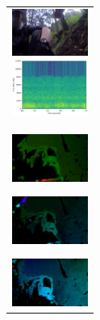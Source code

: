 \begin{figure}[H]
\begin{tabular}{l}
\begin{minipage}{0.165\hsize}
\begin{center}
          \includegraphics[clip, width=2.5cm]{./Figures/still_seevictim5.eps}
        \end{center}
      \end{minipage}
      \begin{minipage}{0.165\hsize}
        \begin{center}
          \includegraphics[clip, width=2.5cm]{./Figures/sound_seevictim.eps}
        \end{center}
      \end{minipage}
\\  %
      \begin{minipage}{0.165\hsize}
        \begin{center}
          \includegraphics[clip, width=2.5cm]{./Figures/optic_seevictim1.eps}
          \hspace{0.3cm} { }
        \end{center}
      \end{minipage}
      \begin{minipage}{0.165\hsize}
        \begin{center}
          \includegraphics[clip, width=2.5cm]{./Figures/optic_seevictim2.eps}
          \hspace{0.0cm} { }
        \end{center}
      \end{minipage}
      \begin{minipage}{0.165\hsize}
        \begin{center}
          \includegraphics[clip, width=2.5cm]{./Figures/optic_seevictim3.eps}

\end{center}
\end{minipage}
\end{tabular}
\end{figure}
